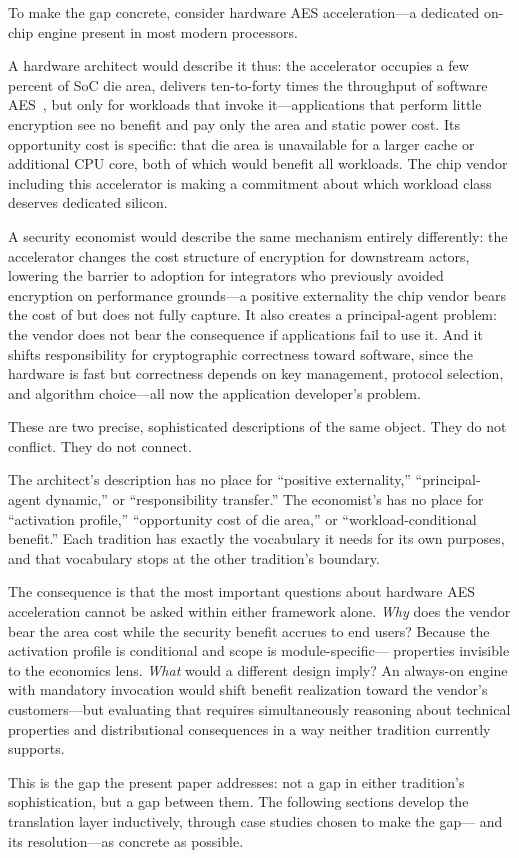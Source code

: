 To make the gap concrete, consider hardware AES acceleration---a dedicated
on-chip engine present in most modern processors.

A hardware architect would describe it thus: the accelerator occupies a few
percent of SoC die area, delivers ten-to-forty times the throughput of software
AES~\cite{intel2012aesni,xie2024opentitan}, but only for workloads that invoke
it---applications that perform little encryption see no benefit and pay only
the area and static power cost. Its opportunity cost is specific: that die area
is unavailable for a larger cache or additional CPU core, both of which would
benefit all workloads. The chip vendor including this accelerator is making a
commitment about which workload class deserves dedicated silicon.

A security economist would describe the same mechanism entirely differently:
the accelerator changes the cost structure of encryption for downstream actors,
lowering the barrier to adoption for integrators who previously avoided
encryption on performance grounds---a positive externality the chip vendor
bears the cost of but does not fully capture. It also creates a principal-agent
problem: the vendor does not bear the consequence if applications fail to use
it. And it shifts responsibility for cryptographic correctness toward software,
since the hardware is fast but correctness depends on key management, protocol
selection, and algorithm choice---all now the application developer's problem.

These are two precise, sophisticated descriptions of the same object. They do
not conflict. They do not connect.

The architect's description has no place for ``positive externality,''
``principal-agent dynamic,'' or ``responsibility transfer.'' The economist's
has no place for ``activation profile,'' ``opportunity cost of die area,'' or
``workload-conditional benefit.'' Each tradition has exactly the vocabulary it
needs for its own purposes, and that vocabulary stops at the other tradition's
boundary.

The consequence is that the most important questions about hardware AES
acceleration cannot be asked within either framework alone. \emph{Why} does
the vendor bear the area cost while the security benefit accrues to end users?
Because the activation profile is conditional and scope is module-specific---
properties invisible to the economics lens. \emph{What} would a different
design imply? An always-on engine with mandatory invocation would shift benefit
realization toward the vendor's customers---but evaluating that requires
simultaneously reasoning about technical properties and distributional
consequences in a way neither tradition currently supports.

This is the gap the present paper addresses: not a gap in either tradition's
sophistication, but a gap between them. The following sections develop the
translation layer inductively, through case studies chosen to make the gap---
and its resolution---as concrete as possible.
